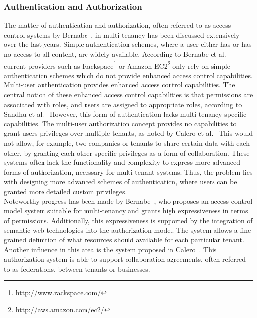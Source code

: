 \subsubsection{Authentication and Authorization}
The matter of authentication and authorization, often referred to as access control systems by Bernabe~\cite{Bernabe2012Auth}, in multi-tenancy has been discussed extensively over the last years. 
Simple authentication schemes, where a user either has or has no access to all content, are widely available.
According to Bernabe et al.~\cite{Bernabe2012Auth} current providers such as Rackspace\footnote{http://www.rackspace.com/} or Amazon EC2\footnote{http://aws.amazon.com/ec2/} only rely on simple authentication schemes which do not provide enhanced access control capabilities. 
Multi-user authentication provides enhanced access control capabilities.
The central notion of these enhanced access control capabilities is that permissions are associated with roles, and users are assigned to appropriate roles, according to Sandhu et al.~\cite{Sandhu1996Auth}
However, this form of authentication lacks multi-tenancy-specific capabilities. 
The multi-user authorization concept provides no capabilities to grant users privileges over multiple tenants, as noted by Calero et al.~\cite{Calero2010Auth}
This would not allow, for example, two companies or tenants to share certain data with each other, by granting each other specific privileges as a form of collaboration.
These systems often lack the functionality and complexity to express more advanced forms of authorization, necessary for multi-tenant systems.
Thus, the problem lies with designing more advanced schemes of authentication, where users can be granted more detailed custom privileges.\\

Noteworthy progress has been made by Bernabe~\cite{Bernabe2012Auth}, who proposes an access control model system suitable for multi-tenancy and grants high expressiveness in terms of permissions. 
Additionally, this expressiveness is supported by the integration of semantic web technologies into the authorization model. 
The system allows a fine-grained definition of what resources should available for each particular tenant. 
Another influence in this area is the system proposed in Calero~\cite{Calero2010Auth}. 
This authorization system is able to support collaboration agreements, often referred to as federations, between tenants or businesses.

